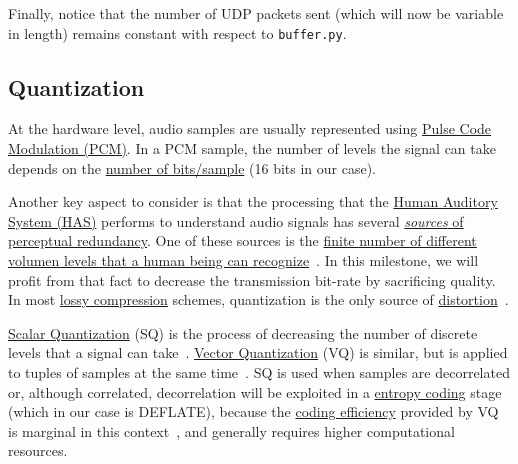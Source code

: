 Finally, notice that the number of UDP packets sent (which will now be
variable in length) remains constant with respect to \verb|buffer.py|.

\subsection{Quantization}
At the hardware level, audio samples are usually represented
using \href{https://en.wikipedia.org/wiki/Pulse-code_modulation}{Pulse
  Code Modulation (PCM)}. In a PCM sample, the number of levels
the signal can take depends on the
\href{https://en.wikipedia.org/wiki/Audio_bit_depth}{number of
  bits/sample} (16 bits in our case).

Another key aspect to consider is that the processing that the
\href{https://en.wikipedia.org/wiki/Auditory_system}{Human
  Auditory System (HAS)} performs to understand audio signals has several
\href{https://en.wikipedia.org/wiki/Psychoacoustics}{\emph{sources} of
  perceptual redundancy}. One of these sources is the
\href{https://en.wikipedia.org/wiki/Equal-loudness_contour}{finite
  number of different volumen levels that a human being can
  recognize}~\cite{bosi2003intro}. In this milestone, we will profit from
that fact to decrease the transmission bit-rate by sacrificing
quality. In most
\href{https://en.wikipedia.org/wiki/Lossy_compression}{lossy
  compression} schemes, quantization is the only source of
\href{https://en.wikipedia.org/wiki/Distortion}{distortion}~\cite{taubman2002jpeg2000}.

\href{https://en.wikipedia.org/wiki/Quantization_(signal_processing)}{Scalar
  Quantization} (SQ) is the process of decreasing the number of
discrete levels that a signal can
take~\cite{sayood2017introduction}. \href{https://en.wikipedia.org/wiki/Vector_quantization}{Vector
  Quantization} (VQ) is similar, but is applied to tuples of samples
at the same time~\cite{vetterli2014foundations}. SQ is used when
samples are decorrelated or, although correlated,
decorrelation will be exploited in a
\href{https://en.wikipedia.org/wiki/Entropy_encoding}{entropy coding}
stage (which in our case is DEFLATE), because the
\href{https://en.wikipedia.org/wiki/Quantization_(signal_processing)#Rate%E2%80%93distortion_optimization}{coding
  efficiency} provided by VQ is marginal in this
context~\cite{vetterli2014foundations}, and generally requires higher
computational resources.

